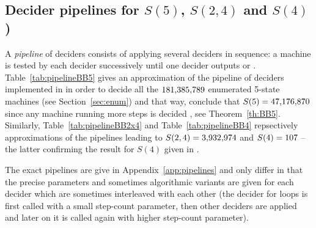 \subsection{Decider pipelines for $S(5)$, $S(2,4)$ and $S(4)$)}\label{sec:pipelines}
A \textit{pipeline} of deciders consists of applying several deciders in sequence: a machine is tested by each decider successively until one decider outputs \HALT or \NONHALT. Table~\ref{tab:pipelineBB5} gives an approximation of the pipeline of deciders implemented in \CoqBB in order to decide all the $181{,}385{,}789$ enumerated 5-state machines (see Section~\ref{sec:enum}) and that way, conclude that $S(5) = 47{,}176{,}870$ since any machine running more steps is decided \NONHALT, see Theorem~\ref{th:BB5}. Similarly, Table~\ref{tab:pipelineBB2x4} and Table~\ref{tab:pipelineBB4} repsectively approximations of the pipelines leading to $S(2,4) = 3{,}932{,}974$ and $S(4) = 107$ -- the latter confirming the result for $S(4)$ given in \cite{Brady83}.

The exact pipelines are give in Appendix~\ref{app:pipelines} and only differ in that the precise parameters and sometimes algorithmic variants are given for each decider which are sometimes interleaved with each other (\eg the decider for loops is first called with a small step-count parameter, then other deciders are applied and later on it is called again with higher step-count parameter).



